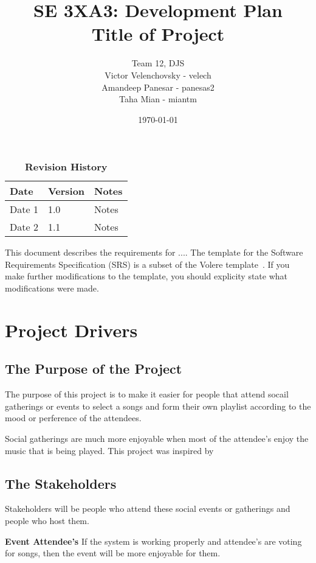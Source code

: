 \documentclass[12pt, titlepage]{article}
\title{SE 3XA3: Development Plan\\Title of Project}
\author{Team 12, DJS
	\\ Victor Velenchovsky - velech
	\\ Amandeep Panesar - panesas2
	\\ Taha Mian - miantm
}
\date{\today}
\begin{document}
\maketitle

\tableofcontents
\listoftables
\listoffigures

\begin{table}[bp]
\caption{\bf Revision History}
\begin{tabularx}{\textwidth}{p{3cm}p{2cm}X}
\toprule {\bf Date} & {\bf Version} & {\bf Notes}\\
\midrule
Date 1 & 1.0 & Notes\\
Date 2 & 1.1 & Notes\\
\bottomrule
\end{tabularx}
\end{table}

\newpage


This document describes the requirements for ....  The template for the Software
Requirements Specification (SRS) is a subset of the Volere
template~\citep{RobertsonAndRobertson2012}.  If you make further modifications
to the template, you should explicity state what modifications were made.

\section{Project Drivers}

\subsection{The Purpose of the Project}
The purpose of this project is to make it easier for people that attend socail gatherings or events to select a songs and form their own playlist according to the mood or perference of the attendees.

Social gatherings are much more enjoyable when most of the attendee's enjoy
the music that is being played. This project was inspired by

\subsection{The Stakeholders}
Stakeholders will be people who attend these social events or gatherings and people who host them.

\textbf{Event Attendee's}
If the system is working properly and attendee's are voting for songs, then
the event will be more enjoyable for them.
\end{document}
